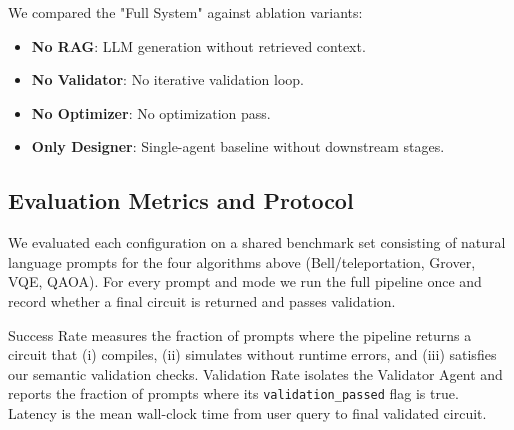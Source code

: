 \documentclass[runningheads]{llncs}
\begin{document}
We compared the "Full System" against ablation variants:
\begin{itemize}
    \item \textbf{No RAG}: LLM generation without retrieved context.
    \item \textbf{No Validator}: No iterative validation loop.
    \item \textbf{No Optimizer}: No optimization pass.
    \item \textbf{Only Designer}: Single-agent baseline without downstream stages.
\end{itemize}

\subsection{Evaluation Metrics and Protocol}
We evaluated each configuration on a shared benchmark set consisting of natural language prompts for the four algorithms above (Bell/teleportation, Grover, VQE, QAOA). For every prompt and mode we run the full pipeline once and record whether a final circuit is returned and passes validation.

Success Rate measures the fraction of prompts where the pipeline returns a circuit that (i) compiles, (ii) simulates without runtime errors, and (iii) satisfies our semantic validation checks. Validation Rate isolates the Validator Agent and reports the fraction of prompts where its \texttt{validation\_passed} flag is true. Latency is the mean wall-clock time from user query to final validated circuit.
\end{document}
